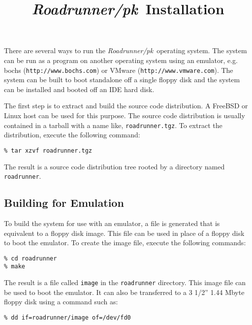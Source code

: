 \pagestyle{empty}
\flushbottom


\def\roadrunner{{\em Roadrunner/pk}}

\title{\roadrunner\  Installation}
\date{}
\maketitle
\thispagestyle{empty}


There are several ways to run the \roadrunner\  operating system.  The
system can be run as a program on another operating system using an
emulator, e.g. bochs ({\tt http://www.bochs.com}) or VMware
({\tt http://www.vmware.com}).  The system can be built to boot
standalone off a single floppy disk and the system can be installed
and booted off an IDE hard disk.

The first step is to extract and build the source code distribution.  A
FreeBSD or Linux host can be used for this purpose.  The source code
distribution is usually contained in a tarball with a name like,
{\tt roadrunner.tgz}.  To extract the distribution, execute the following
command:

\begin{verbatim}
% tar xzvf roadrunner.tgz
\end{verbatim}

\noindent The result is a source code distribution tree rooted by a
directory named {\tt roadrunner}.

\subsection*{Building for Emulation}

To build the system for use with an emulator, a file is generated that
is equivalent to a floppy disk image.  This file can be used in place of
a floppy disk to boot the emulator.  To create the image file, execute
the following commands:

\begin{verbatim}
% cd roadrunner
% make
\end{verbatim}

\noindent The result is a file called {\tt image} in the {\tt roadrunner}
directory.  This image file can be used to boot the emulator.  It can also
be transferred to a 3 1/2'' 1.44 Mbyte floppy disk using a command such
as:

\begin{verbatim}
% dd if=roadrunner/image of=/dev/fd0
\end{verbatim}

